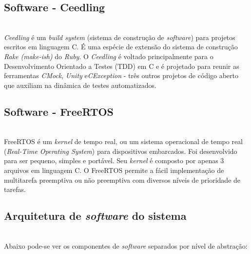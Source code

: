 \documentclass[times, twoside, watermark]{artigo}
\begin{document}
\subsection{Software - Ceedling}\hfill\\
\textit{Ceedling} é um \textit{build system} (sistema de construção de \textit{software}) para projetos escritos em linguagem C.
É uma espécie de extensão do sistema de construção \textit{Rake (make-ish)} do \textit{Ruby}.
O \textit{Ceedling} é voltado principalmente para o Desenvolvimento Orientado a Testes (TDD) em C e é projetado para reunir as ferramentas \textit{CMock},
\textit{Unity} e\textit{CException} - três outros projetos de código aberto que auxiliam na dinâmica de testes automatizados. \cite{gomes2016uttos}


\subsection{Software - FreeRTOS}\hfill\\
FreeRTOS é um \textit{kernel} de tempo real, ou um sistema operacional de tempo real (\textit{Real-Time Operating System}) 
para dispositivos embarcados. Foi desenvolvido para ser pequeno, simples e portável. 
Seu \textit{kernel} é composto por apenas 3 arquivos em linguagem C. 
O FreeRTOS permite a fácil implementação de multitarefa preemptiva ou não preemptiva com diversos níveis de prioridade de tarefas.\cite{barry2008freertos}


\subsection{Arquitetura de \textit{software} do sistema}\hfill\\
Abaixo pode-se ver os componentes de \textit{software} separados por nível de abstração:





\end{document}

